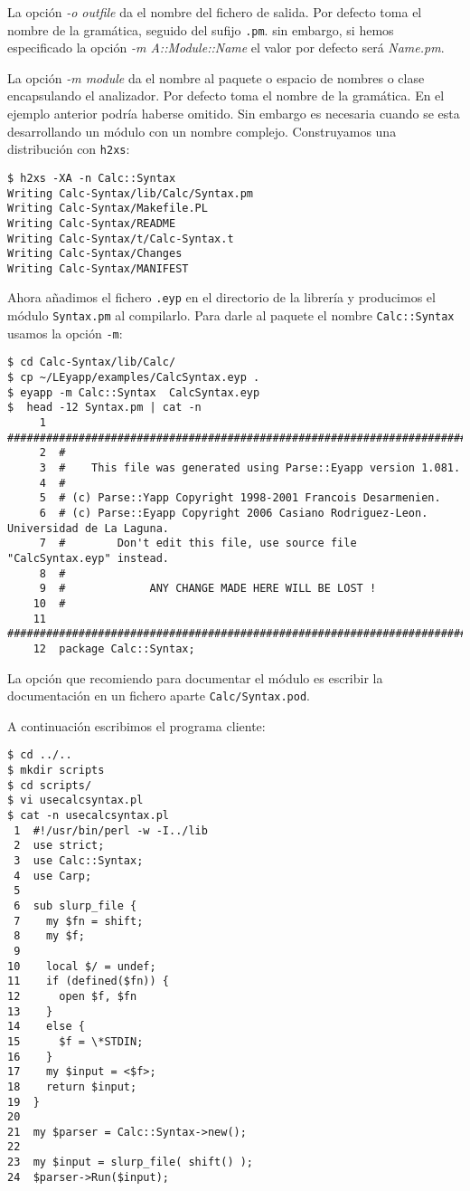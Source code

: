 La opción \textit{-o outfile} \mbox{}
da el nombre del fichero de salida. Por defecto toma el nombre de la gramática,
seguido del sufijo \verb|.pm|. sin embargo, si hemos especificado la opción
\textit{-m A::Module::Name} el valor por defecto será  \emph{Name.pm}.


La opción \textit{-m module} \mbox{}
da el nombre  al paquete o espacio de nombres o clase encapsulando el
analizador. Por defecto toma el nombre de la gramática.  En el ejemplo anterior
podría haberse omitido. Sin embargo es necesaria cuando se esta desarrollando 
un módulo con un nombre complejo. Construyamos una distribución con
\verb|h2xs|:

\begin{verbatim}
$ h2xs -XA -n Calc::Syntax
Writing Calc-Syntax/lib/Calc/Syntax.pm
Writing Calc-Syntax/Makefile.PL
Writing Calc-Syntax/README
Writing Calc-Syntax/t/Calc-Syntax.t
Writing Calc-Syntax/Changes
Writing Calc-Syntax/MANIFEST
\end{verbatim}
Ahora añadimos el fichero \verb|.eyp| en el directorio de
la librería y producimos el módulo \verb|Syntax.pm|
al compilarlo. Para darle al paquete el nombre
\verb|Calc::Syntax| usamos la opción \verb|-m|:
\begin{verbatim}
$ cd Calc-Syntax/lib/Calc/
$ cp ~/LEyapp/examples/CalcSyntax.eyp .
$ eyapp -m Calc::Syntax  CalcSyntax.eyp
$  head -12 Syntax.pm | cat -n
     1  ###################################################################################
     2  #
     3  #    This file was generated using Parse::Eyapp version 1.081.
     4  #
     5  # (c) Parse::Yapp Copyright 1998-2001 Francois Desarmenien.
     6  # (c) Parse::Eyapp Copyright 2006 Casiano Rodriguez-Leon. Universidad de La Laguna.
     7  #        Don't edit this file, use source file "CalcSyntax.eyp" instead.
     8  #
     9  #             ANY CHANGE MADE HERE WILL BE LOST !
    10  #
    11  ###################################################################################
    12  package Calc::Syntax;
\end{verbatim}
La opción que recomiendo para documentar el módulo  es escribir
la documentación en un fichero aparte
\verb|Calc/Syntax.pod|.


A continuación escribimos el programa cliente:
\begin{verbatim}
$ cd ../..
$ mkdir scripts
$ cd scripts/
$ vi usecalcsyntax.pl
$ cat -n usecalcsyntax.pl
 1  #!/usr/bin/perl -w -I../lib
 2  use strict;
 3  use Calc::Syntax;
 4  use Carp;
 5
 6  sub slurp_file {
 7    my $fn = shift;
 8    my $f;
 9
10    local $/ = undef;
11    if (defined($fn)) {
12      open $f, $fn
13    }
14    else {
15      $f = \*STDIN;
16    }
17    my $input = <$f>;
18    return $input;
19  }
20
21  my $parser = Calc::Syntax->new();
22
23  my $input = slurp_file( shift() );
24  $parser->Run($input);
\end{verbatim}

